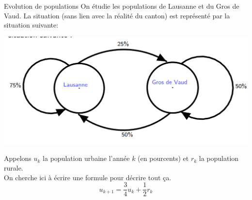 \begin{parag}{Evolution de populations}
    On étudie les populations de Lausanne et du Gros de Vaud. La situation (sans lien avec la réalité du canton) est représenté par la situation suivante:
    \begin{center}
        \includegraphics[scale=0.4]{Algèbre linéàaire/Screenshot 2024-11-28 081103.png}
    \end{center}
    Appelons $u_k$ la population urbaine l'année $k$ (en pourcents) et $r_k$ la population rurale.
    \\ 
    On cherche ici à écrire une formule pour décrire tout ça.\\
    \[u_{k+1} = \frac{3}{4}u_k + \frac{1}{2}r_k\]
    

\end{parag}
